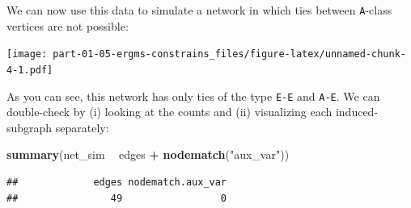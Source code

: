\documentclass[]{book}
\newenvironment{Shaded}{\begin{snugshade}}{\end{snugshade}}
\newcommand{\CommentTok}[1]{\textcolor[rgb]{0.56,0.35,0.01}{\textit{#1}}}
\newcommand{\DataTypeTok}[1]{\textcolor[rgb]{0.13,0.29,0.53}{#1}}
\newcommand{\DecValTok}[1]{\textcolor[rgb]{0.00,0.00,0.81}{#1}}
\newcommand{\FloatTok}[1]{\textcolor[rgb]{0.00,0.00,0.81}{#1}}
\newcommand{\KeywordTok}[1]{\textcolor[rgb]{0.13,0.29,0.53}{\textbf{#1}}}
\newcommand{\NormalTok}[1]{#1}
\newcommand{\OperatorTok}[1]{\textcolor[rgb]{0.81,0.36,0.00}{\textbf{#1}}}
\newcommand{\OtherTok}[1]{\textcolor[rgb]{0.56,0.35,0.01}{#1}}
\newcommand{\StringTok}[1]{\textcolor[rgb]{0.31,0.60,0.02}{#1}}
\begin{document}
We can now use this data to simulate a network in which ties between
\texttt{A}-class vertices are not possible:

\begin{Shaded}
\end{Shaded}

\texttt{[image: part-01-05-ergms-constrains\_files/figure-latex/unnamed-chunk-4-1.pdf]}

As you can see, this network has only ties of the type \texttt{E-E} and \texttt{A-E}. We can
double-check by (i) looking at the counts and (ii) visualizing each induced-subgraph
separately:

\begin{Shaded}
\begin{Highlighting}[]
\KeywordTok{summary}\NormalTok{(net_sim }\OperatorTok{~}\StringTok{ }\NormalTok{edges }\OperatorTok{+}\StringTok{ }\KeywordTok{nodematch}\NormalTok{(}\StringTok{"aux_var"}\NormalTok{))}
\end{Highlighting}
\end{Shaded}

\begin{verbatim}
##             edges nodematch.aux_var 
##                49                 0
\end{verbatim}

\begin{Shaded}
\end{Shaded}
\end{document}
